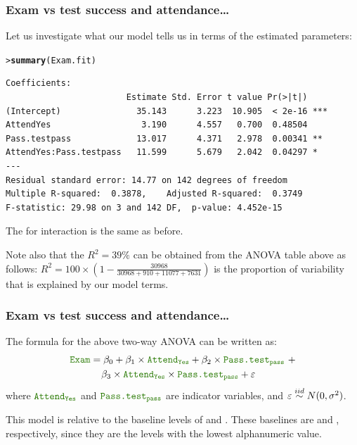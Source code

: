 \documentclass{beamer}\usepackage[]{graphicx}\usepackage[]{xcolor}
\makeatletter
\newcommand{\hlstd}[1]{\textcolor[rgb]{0.345,0.345,0.345}{#1}}%
\newcommand{\hlkwd}[1]{\textcolor[rgb]{0.737,0.353,0.396}{\textbf{#1}}}%
\newenvironment{kframe}{%
 \def\at@end@of@kframe{}%
 \ifinner\ifhmode%
  \def\at@end@of@kframe{\end{minipage}}%
  \begin{minipage}{\columnwidth}%
 \fi\fi%
 \def\FrameCommand##1{\hskip\@totalleftmargin \hskip-\fboxsep
 \colorbox{shadecolor}{##1}\hskip-\fboxsep
     \hskip-\linewidth \hskip-\@totalleftmargin \hskip\columnwidth}%
 \MakeFramed {\advance\hsize-\width
   \@totalleftmargin\z@ \linewidth\hsize
   \@setminipage}}%
 {\par\unskip\endMakeFramed%
 \at@end@of@kframe}
\newenvironment{knitrout}{}{} %
\makeatother
\begin{document}
\begin{frame}[fragile, label={frame:two-way_refcellcoef}]
\frametitle{Exam vs test success and attendance\ldots}
Let us investigate what our model tells us in terms of the estimated parameters:

\begin{knitrout}\scriptsize
{}\color{fgcolor}\begin{kframe}
\begin{alltt}
\hlstd{> }\hlkwd{summary}\hlstd{(Exam.fit)}
\end{alltt}
\end{kframe}
\end{knitrout}

\begin{knitrout}\scriptsize
{}\color{fgcolor}\begin{kframe}
\begin{verbatim}
Coefficients:
                        Estimate Std. Error t value Pr(>|t|)    
(Intercept)               35.143      3.223  10.905  < 2e-16 ***
AttendYes                  3.190      4.557   0.700  0.48504    
Pass.testpass             13.017      4.371   2.978  0.00341 ** 
AttendYes:Pass.testpass   11.599      5.679   2.042  0.04297 *  
---
Residual standard error: 14.77 on 142 degrees of freedom
Multiple R-squared:  0.3878,	Adjusted R-squared:  0.3749 
F-statistic: 29.98 on 3 and 142 DF,  p-value: 4.452e-15
\end{verbatim}
\end{kframe}
\end{knitrout}

The \pval{} for interaction is the same as before.

\medskip

Note also that the $R^2=39\%$ can be obtained from the ANOVA table above as follows: $R^2 =100\times\left(1-\frac{30968}{30968+ 910 + 11077 + 7631} \right)$ is the proportion of variability that is explained by our model terms.
\end{frame}



\begin{frame}[fragile]
\frametitle{Exam vs test success and attendance\ldots}

The formula for the above two-way ANOVA can be written as:
\begin{align*}
\rcode{Exam} &= \beta_0 + \beta_1 \times \rcode{Attend}_{\rcode{Yes}} + \beta_2 \times \rcode{Pass.test}_{\rcode{pass}}\mbox{ } + \\ &\phantom{=}\mbox{ }\beta_3 \times \rcode{Attend}_{\rcode{Yes}} \times \rcode{Pass.test}_{\rcode{pass}} + \varepsilon 
\end{align*}
where $\rcode{Attend}_{\rcode{Yes}}$ and $\rcode{Pass.test}_{\rcode{pass}}$ are indicator variables, and $\varepsilon \stackrel{iid}{\sim} N(0, \sigma^2)$.
\bigskip

This model is relative to the baseline levels of  and .
These baselines are  and , respectively, since they are the levels with the lowest alphanumeric value.
\end{frame}
\end{document}
